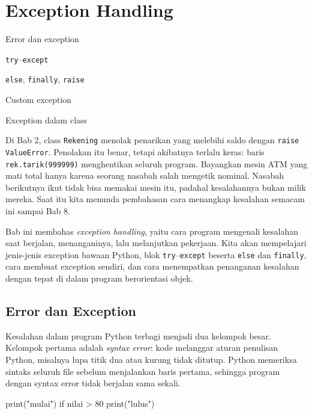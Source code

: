 \chapter{Exception Handling}

\begin{dibabini}
  \item Error dan exception
  \item \texttt{try}--\texttt{except}
  \item \texttt{else}, \texttt{finally}, \texttt{raise}
  \item Custom exception
  \item Exception dalam class
\end{dibabini}

Di Bab 2, class \texttt{Rekening} menolak penarikan yang melebihi saldo dengan \texttt{raise ValueError}. Penolakan itu benar, tetapi akibatnya terlalu keras: baris \texttt{rek.tarik(999999)} menghentikan seluruh program. Bayangkan mesin ATM yang mati total hanya karena seorang nasabah salah mengetik nominal. Nasabah berikutnya ikut tidak bisa memakai mesin itu, padahal kesalahannya bukan milik mereka. Saat itu kita menunda pembahasan cara menangkap kesalahan semacam ini sampai Bab 8.

Bab ini membahas \emph{exception handling}, yaitu cara program mengenali kesalahan saat berjalan, menanganinya, lalu melanjutkan pekerjaan. Kita akan mempelajari jenis-jenis exception bawaan Python, blok \texttt{try}--\texttt{except} beserta \texttt{else} dan \texttt{finally}, cara membuat exception sendiri, dan cara menempatkan penanganan kesalahan dengan tepat di dalam program berorientasi objek.

\section{Error dan Exception}

Kesalahan dalam program Python terbagi menjadi dua kelompok besar. Kelompok pertama adalah \emph{syntax error}: kode melanggar aturan penulisan Python, misalnya lupa titik dua atau kurung tidak ditutup. Python memeriksa sintaks seluruh file sebelum menjalankan baris pertama, sehingga program dengan syntax error tidak berjalan sama sekali.

\begin{kode}
print("mulai")
if nilai > 80
    print("lulus")
\end{kode}

